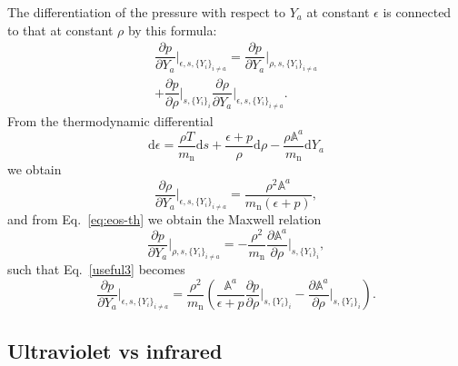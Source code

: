 \documentclass[aps,prd,twocolumn,a4paper,floatfix,nofootbib,superscriptaddress,nofootinbib]{revtex4}
\newcommand{\rn}{\mathrm{n}}
\begin{document}
The differentiation of the pressure with respect to $Y_a$ at constant
$\epsilon$ is connected to that at constant $\rho$ by this formula:
%
\begin{multline}
\label{useful3}
\dfrac{\partial p}{\partial Y_a} \bigg|_{\epsilon,s,\{Y_i \}_{i\neq a}}=
\dfrac{\partial p}{\partial Y_a} \bigg|_{\rho,s,\{Y_i \}_{i\neq a}}\\
+\dfrac{\partial p}{\partial \rho}\bigg|_{s,\{Y_i\}_i}  \dfrac{\partial
\rho}{\partial Y_a} \bigg|_{\epsilon,s,\{Y_i \}_{i\neq a}}.
\end{multline}
%
From the thermodynamic differential
%
\begin{equation}
\mathrm d\epsilon = \dfrac{\rho T}{m_\rn}\mathrm  ds +\dfrac{\epsilon +p}{\rho} \mathrm
d\rho -  \dfrac{\rho \mathbb{A}^a}{m_\rn}\mathrm dY_a
\end{equation}
%
we obtain
%
\begin{equation}
\dfrac{\partial \rho}{\partial Y_a} \bigg|_{\epsilon,s,\{Y_i \}_{i\neq a}} =
\dfrac{\rho^2 \mathbb{A}^a}{m_\rn (\epsilon+p)},
\end{equation}
%
and from Eq.~\eqref{eq:eos-th} we obtain the Maxwell relation
%
\begin{equation}
\dfrac{\partial p}{\partial Y_a} \bigg|_{\rho,s,\{Y_i \}_{i\neq a}} =
-\dfrac{\rho^2}{m_\rn} \dfrac{\partial \mathbb{A}^a}{\partial
\rho}\bigg|_{s,\{Y_i\}_i},
\end{equation}
%
such that Eq.~\eqref{useful3} becomes
%
\begin{equation}
\label{useful2}
\dfrac{\partial p}{\partial Y_a} \bigg|_{\epsilon,s,\{Y_i \}_{i\neq a}} =
\frac{\rho^2}{m_\rn}\left(\dfrac{\mathbb{A}^a}{\epsilon+p}\dfrac{\partial p}{\partial
\rho}\bigg|_{s,\{Y_i\}_i}
 -\dfrac{\partial \mathbb{A}^a}{\partial \rho}\bigg|_{s,\{Y_i\}_i}\right).
\end{equation}

\subsection{Ultraviolet vs infrared}
\label{sec:uv-vs-ir}
\end{document}
